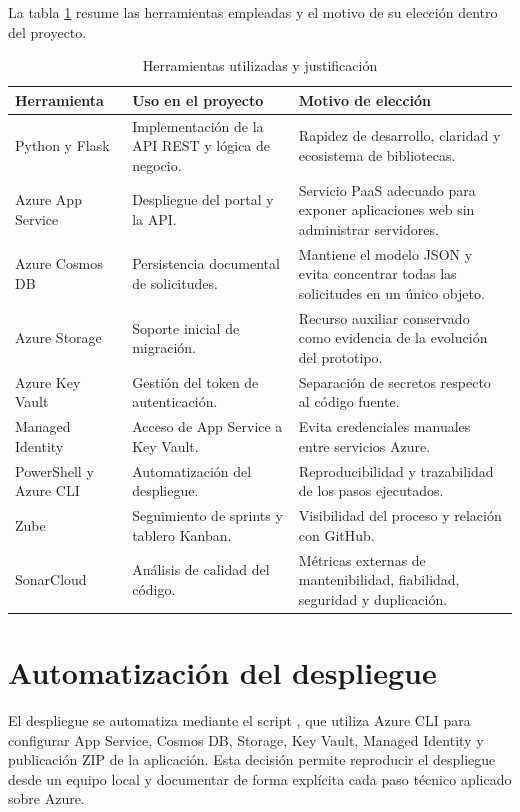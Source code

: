 La tabla \ref{tabla:herramientas_utilizadas} resume las herramientas empleadas y el motivo de su elección dentro del proyecto.

\begin{table}[h]
\centering
\small
\begin{tabularx}{\textwidth}{l X X}
\textbf{Herramienta} & \textbf{Uso en el proyecto} & \textbf{Motivo de elección} \\
\hline
Python y Flask & Implementación de la API REST y lógica de negocio. & Rapidez de desarrollo, claridad y ecosistema de bibliotecas. \\
Azure App Service & Despliegue del portal y la API. & Servicio PaaS adecuado para exponer aplicaciones web sin administrar servidores. \\
Azure Cosmos DB & Persistencia documental de solicitudes. & Mantiene el modelo JSON y evita concentrar todas las solicitudes en un único objeto. \\
Azure Storage & Soporte inicial de migración. & Recurso auxiliar conservado como evidencia de la evolución del prototipo. \\
Azure Key Vault & Gestión del token de autenticación. & Separación de secretos respecto al código fuente. \\
Managed Identity & Acceso de App Service a Key Vault. & Evita credenciales manuales entre servicios Azure. \\
PowerShell y Azure CLI & Automatización del despliegue. & Reproducibilidad y trazabilidad de los pasos ejecutados. \\
Zube & Seguimiento de sprints y tablero Kanban. & Visibilidad del proceso y relación con GitHub. \\
SonarCloud & Análisis de calidad del código. & Métricas externas de mantenibilidad, fiabilidad, seguridad y duplicación. \\
\end{tabularx}
\caption{Herramientas utilizadas y justificación}
\label{tabla:herramientas_utilizadas}
\end{table}

\section{Automatización del despliegue}

\begin{sloppypar}
El despliegue se automatiza mediante el script , que utiliza Azure CLI para configurar App Service, Cosmos DB, Storage, Key Vault, Managed Identity y publicación ZIP de la aplicación. Esta decisión permite reproducir el despliegue desde un equipo local y documentar de forma explícita cada paso técnico aplicado sobre Azure.
\end{sloppypar}

